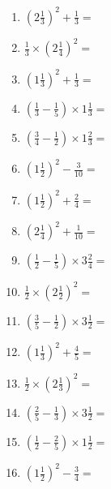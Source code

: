 \documentclass[12pt]{article}
\begin{document}
\begin{enumerate}
\item \large $ \left( 2 \frac{1}{3} \right)^2 + \frac{1}{3} = $ \vspace{1.6cm}
\item \large $ \frac{1}{3} \times \left( 2 \frac{1}{4} \right)^2 = $ \vspace{1.6cm}
\item \large $ \left( 1 \frac{1}{3} \right)^2 + \frac{1}{3} = $ \vspace{1.6cm}
\item \large $ \left( \frac{1}{3} - \frac{1}{5} \right) \times 1 \frac{1}{3} = $ \vspace{1.6cm}
\item \large $ \left( \frac{3}{4} - \frac{1}{2} \right) \times 1 \frac{2}{3} = $ \vspace{1.6cm}
\item \large $ \left( 1 \frac{1}{2} \right)^2 - \frac{3}{10} = $ \vspace{1.6cm}
\newpage
\item \large $ \left( 1 \frac{1}{2} \right)^2 + \frac{2}{4} = $ \vspace{1.6cm}
\item \large $ \left( 2 \frac{1}{4} \right)^2 + \frac{1}{10} = $ \vspace{1.6cm}
\item \large $ \left( \frac{1}{2} - \frac{1}{5} \right) \times 3 \frac{2}{4} = $ \vspace{1.6cm}
\item \large $ \frac{1}{2} \times \left( 2 \frac{1}{2} \right)^2 = $ \vspace{1.6cm}
\item \large $ \left( \frac{3}{5} - \frac{1}{2} \right) \times 3 \frac{1}{2} = $ \vspace{1.6cm}
\item \large $ \left( 1 \frac{1}{3} \right)^2 + \frac{4}{5} = $ \vspace{1.6cm}
\item \large $ \frac{1}{2} \times \left( 2 \frac{1}{3} \right)^2 = $ \vspace{1.6cm}
\item \large $ \left( \frac{2}{5} - \frac{1}{3} \right) \times 3 \frac{1}{2} = $ \vspace{1.6cm}
\item \large $ \left( \frac{1}{2} - \frac{2}{5} \right) \times 1 \frac{1}{2} = $ \vspace{1.6cm}
\item \large $ \left( 1 \frac{1}{2} \right)^2 - \frac{3}{4} = $ \vspace{1.6cm}

\end{enumerate}
\end{document}
